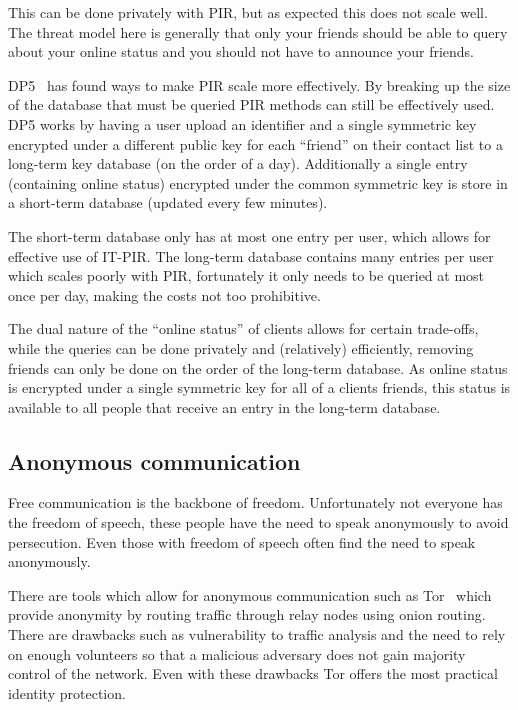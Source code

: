 This can be done privately with PIR, but as expected this does not scale well.
The threat model here is generally that only your friends should be able to
query about your online status and you should not have to announce your friends.

DP5~\cite{borisov2015dp5} has found ways to make PIR scale more effectively. By
breaking up the size of the database that must be queried PIR methods can still
be effectively used. DP5 works by having a user upload an identifier and a
single symmetric key encrypted under a different public key for each ``friend''
on their contact list to a long-term key database (on the order of a day).
Additionally a single entry (containing online status) encrypted under the
common symmetric key is store in a short-term database (updated every few
minutes). 

The short-term database only has at most one entry per user, which allows for
effective use of IT-PIR. The long-term database contains many entries per user
which scales poorly with PIR, fortunately it only needs to be queried at most
once per day, making the costs not too prohibitive. 

The dual nature of the ``online status'' of clients allows for certain
trade-offs, while the queries can be done privately and (relatively)
efficiently, removing friends can only be done on the order of the long-term
database. As online status is encrypted under a single symmetric key for all of
a clients friends, this status is available to all people that receive an entry
in the long-term database.

\subsection{Anonymous communication}\label{sec:anonymousCommunication}
Free communication is the backbone of freedom. Unfortunately not everyone has
the freedom of speech, these people have the need to speak anonymously to avoid
persecution. Even those with freedom of speech often find the need to speak
anonymously.

There are tools which allow for anonymous communication such as
Tor~\cite{syverson2004tor} which provide anonymity by routing traffic through
relay nodes using onion routing. There are drawbacks such as vulnerability to
traffic analysis and the need to rely on enough volunteers so that a malicious
adversary does not gain majority control of the network. Even with these
drawbacks Tor offers the most practical identity protection. 

